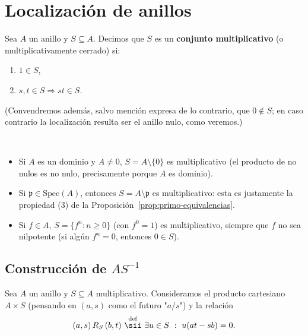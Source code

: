 \section{Localización de anillos}

\begin{definicion}
Sea $A$ un anillo y $S\subseteq A$. Decimos que $S$ es un \textbf{conjunto multiplicativo} (o multiplicativamente cerrado) si:
\begin{enumerate}
    \item $1\in S$,
    \item $s,t\in S \Rightarrow st\in S$.
\end{enumerate}
(Convendremos además, salvo mención expresa de lo contrario, que $0\notin S$; en caso contrario la localización resulta ser el anillo nulo, como veremos.)
\end{definicion}

\begin{ejemplo}\
\begin{itemize}
    \item Si $A$ es un dominio y $A\neq 0$, $S=A\setminus\{0\}$ es multiplicativo (el producto de no nulos es no nulo, precisamente porque $A$ es dominio).
    \item Si $\mathfrak p \in \mathrm{Spec}(A)$, entonces $S=A\setminus \mathfrak p$ es multiplicativo: esta es justamente la propiedad (3) de la Proposición~\ref{prop:primo-equivalencias}.
    \item Si $f\in A$, $S=\{f^n : n\geq 0\}$ (con $f^0=1$) es multiplicativo, siempre que $f$ no sea nilpotente (si algún $f^n=0$, entonces $0\in S$).
\end{itemize}
\end{ejemplo}

\subsection{Construcción de $AS^{-1}$}

Sea $A$ un anillo y $S\subseteq A$ multiplicativo. Consideramos el producto cartesiano $A\times S$ (pensando en $(a,s)$ como el futuro "$a/s$") y la relación
\begin{gather*}
    (a,s)\, R_S\, (b,t) \ \overset{\mathrm{def}}{\sii}\ \exists u\in S \ : \ u(at-sb) = 0.
\end{gather*}

